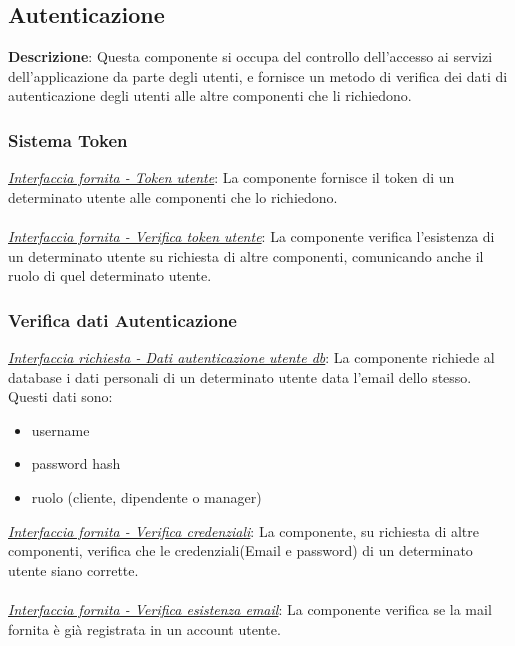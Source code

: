 \documentclass{report}
\begin{document}
\subsection*{Autenticazione}
\textbf{Descrizione}: Questa componente si occupa del controllo dell'accesso ai servizi dell'applicazione da parte degli utenti,
e fornisce un metodo di verifica dei dati di autenticazione degli utenti alle altre componenti che li richiedono.
\subsubsection*{\indent  \indent Sistema Token}
\uline{\textit{Interfaccia fornita - Token utente}}: 
La componente fornisce il token di un determinato utente alle componenti che lo richiedono.\\ \\ 
\uline{\textit{Interfaccia fornita - Verifica token utente}}: 
La componente verifica l'esistenza di un determinato utente su richiesta di altre componenti, comunicando anche il ruolo di quel determinato utente.

\subsubsection*{\indent \indent Verifica dati Autenticazione}
\textcolor{Database}{\uline{\textit{Interfaccia richiesta - Dati autenticazione utente db}}}: 
La componente richiede al database i dati personali di un determinato utente data l'email dello stesso. Questi dati sono:
\begin{itemize}
	\item username
	\item password hash
	\item ruolo (cliente, dipendente o manager)
\end{itemize}
\uline{\textit{Interfaccia fornita - Verifica credenziali}}: 
La componente, su richiesta di altre componenti, verifica che le credenziali(Email e password) di un determinato utente siano corrette.\\ \\ 
\uline{\textit{Interfaccia fornita - Verifica esistenza email}}: 
La componente verifica se la mail fornita è già registrata in un account utente.
\end{document}

